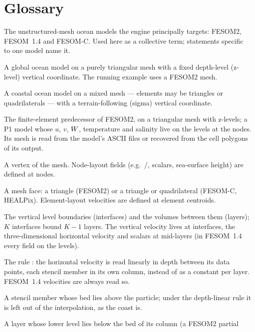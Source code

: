 \chapter{Glossary}\label{app:glossary}

\begin{description}[style=nextline,leftmargin=0pt,font=\normalfont\bfseries]
\item[FESOM family] The unstructured-mesh ocean models the engine principally targets:
  FESOM2, FESOM~1.4 and FESOM-C. Used here as a collective term; statements specific to one model name it.
\item[FESOM2] A global ocean model on a purely triangular mesh with a fixed depth-level
  (z-level) vertical coordinate. The running example uses a FESOM2 mesh.
\item[FESOM-C] A coastal ocean model on a mixed mesh --- elements may be triangles or
  quadrilaterals --- with a terrain-following (sigma) vertical coordinate.
\item[FESOM~1.4] The finite-element predecessor of FESOM2, on a triangular mesh with z-levels; a P1
  model whose $u$, $v$, $W$, temperature and salinity live on the levels at the nodes. Its mesh is read
  from the model's ASCII files or recovered from the cell polygons of its output.
\item[Node] A vertex of the mesh. Node-layout fields (e.g.\ /,
  scalars, sea-surface height) are defined at nodes.
\item[Element] A mesh face: a triangle (FESOM2) or a triangle or quadrilateral (FESOM-C, HEALPix). Element-layout velocities are defined at element centroids.
\item[Interface, layer] The vertical level boundaries (interfaces) and the volumes between
  them (layers); $K$ interfaces bound $K-1$ layers. The vertical velocity lives at
  interfaces, the three-dimensional horizontal velocity and scalars at mid-layers (in FESOM~1.4 every
  field on the levels).
\item[Depth-linear horizontal velocity] The rule : the horizontal velocity
  is read linearly in depth between its data points, each stencil member in its own column, instead of as
  a constant per layer. FESOM~1.4 velocities are always read so.
\item[Wall at depth] A stencil member whose bed lies above the particle; under the depth-linear rule it is
  left out of the interpolation, as the coast is.
\item[Partial bottom layer] A layer whose lower level lies below the bed of its column (a FESOM2 partial

\end{description}
